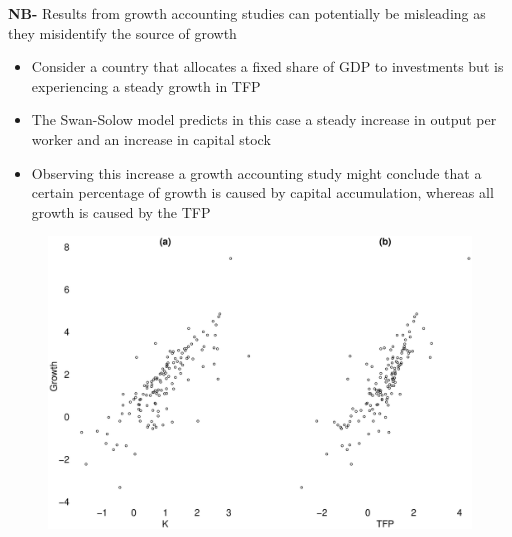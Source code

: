 \documentclass{beamer}
\begin{document}
\begin{frame}
 \textbf{NB-} Results from growth accounting studies can potentially be misleading as they misidentify the source of growth
 \begin{itemize}
   \item Consider a country that allocates a fixed share of GDP to investments but is experiencing a steady growth in TFP
   \item The Swan-Solow model predicts in this case a steady increase in output per worker and an increase in capital stock
   \item Observing this increase a growth accounting study might conclude that a certain percentage of growth is caused by capital accumulation, whereas all growth is caused by the TFP
 \end{itemize}
\end{frame}

\begin{frame}
  \begin{figure}
    \includegraphics[scale=.3]{growth.eps}
  \end{figure}
\end{frame}
\end{document}
